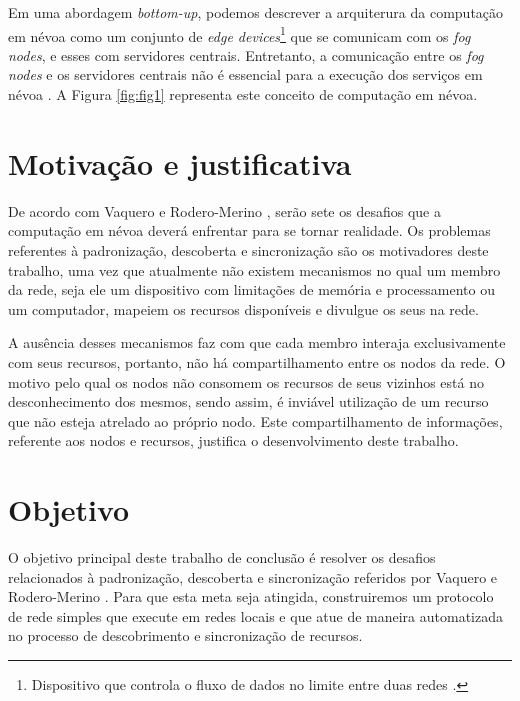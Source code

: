 Em uma abordagem \textit{bottom-up}, podemos descrever a arquiterura da computação em névoa como um conjunto de \textit{edge devices}\footnote{Dispositivo que controla o fluxo de dados no limite entre duas redes \cite{edgeDevices}.} que se comunicam com os \textit{fog nodes}, e esses com servidores centrais.
Entretanto, a comunicação entre os \textit{fog nodes} e os servidores centrais não é essencial para a execução dos serviços em névoa \cite{DBLP:journals/corr/RomanLM16}.
A Figura \ref{fig:fig1} representa este conceito de computação em névoa.

\section{Motivação e justificativa}

De acordo com Vaquero e Rodero-Merino \cite{Vaquero:2014}, serão sete os desafios que a computação em névoa deverá enfrentar para se tornar realidade.
Os problemas referentes à padronização, descoberta e sincronização são os motivadores deste trabalho, uma vez que atualmente não existem mecanismos
no qual um membro da rede, seja ele um dispositivo com limitações de memória e processamento ou um computador, mapeiem os recursos disponíveis e divulgue os seus na rede.

A ausência desses mecanismos faz com que cada membro interaja exclusivamente com seus recursos, portanto, não há compartilhamento entre os nodos da rede.
O motivo pelo qual os nodos não consomem os recursos de seus vizinhos está no desconhecimento dos mesmos, sendo assim, é inviável utilização de um recurso que não esteja atrelado ao próprio nodo.
Este compartilhamento de informações, referente aos nodos e recursos, justifica o desenvolvimento deste trabalho.


\section{Objetivo}

O objetivo principal deste trabalho de conclusão é resolver os desafios relacionados à padronização, descoberta e sincronização referidos por Vaquero e Rodero-Merino \cite{Vaquero:2014}.
Para que esta meta seja atingida, construiremos um protocolo de rede simples que execute em redes locais e que atue de maneira automatizada no processo de
descobrimento e sincronização de recursos.











 
 
 
 
 
 
 
 










